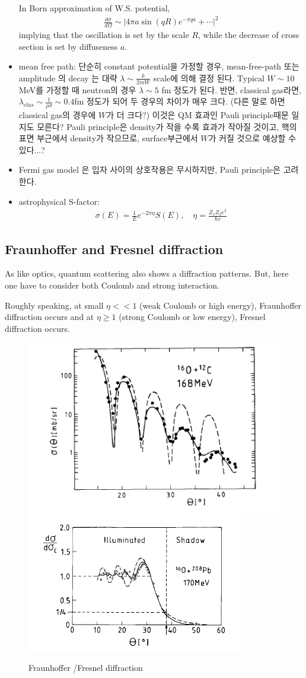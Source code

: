 \documentclass[11pt]{book}
\newcommand{\bea}{\begin{eqnarray}}
\newcommand{\eea}{\end{eqnarray}}
\begin{document}
\begin{itemize}
	        In Born approximation of W.S. potential,
	        \bea 
	        \frac{d\sigma}{d\Omega}\sim |4\pi a \sin(qR)e^{-\pi q a}+\cdots|^2 
	        \eea 
	        implying that the oscillation is set by the scale $R$,
	        while the decrease of cross section is set by diffuseness $a$. 
	        
	 \item mean free path: 단순히 constant potential을 가정할 경우, mean-free-path 또는 amplitude 의 decay 는 대략 $\lambda\sim \frac{k}{2m W}$ scale에 의해 결정 된다.  Typical $W\sim 10 $ MeV를 가정할 때 neutron의 경우 $\lambda\sim 5$ fm 정도가 된다. 
	 반면, classical gas라면, $\lambda_{clas}\sim \frac{1}{\rho \sigma }\sim 0.4$fm 정도가 되어 두 경우의 차이가 매우 크다. (다른 말로 하면 classical gas의 경우에 $W$가 더 크다?)
	 이것은 QM 효과인 Pauli principle때문 일지도 모른다? 
	 Pauli principle은 density가 작을 수록 효과가 작아질 것이고, 핵의 표면 부근에서 density가 
	 작으므로, surface부근에서 $W$가 커질 것으로 예상할 수 있다...?       
	 \item Fermi gas model 은 입자 사이의 상호작용은 무시하지만, Pauli principle은 고려한다.        
	        
	 \item astrophysical S-factor:
	 \bea
	 \sigma(E) = \frac{1}{E}e^{-2\pi\eta} S(E),\quad \eta = \frac{Z_1 Z_2 e^2}{\hbar v}
	 \eea        
\end{itemize}

\subsection{Fraunhoffer and Fresnel diffraction}
As like optics, quantum scattering also shows a diffraction patterns. 
But, here one have to consider both Coulomb and strong interaction. 

Roughly speaking, at small $\eta<< 1$ (weak Coulomb or high energy), 
Fraunhoffer diffraction occurs
and at $\eta\ge 1$ (strong Coulomb or low energy), Fresnel diffraction occurs.

\begin{figure}
	\centering
	\includegraphics[width=0.4\linewidth]{figs/Fraunhoffer}
	\includegraphics[width=0.4\linewidth]{figs/Fresnel_example}
	\caption{Fraunhoffer /Fresnel diffraction }
	\label{fig:fraunhoffer}
\end{figure}
\end{document}
